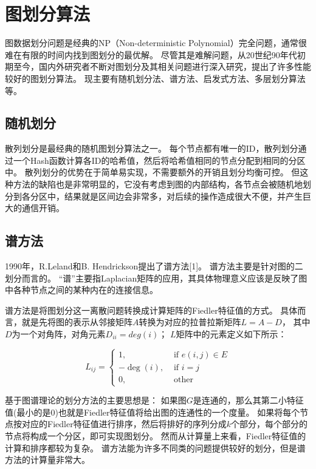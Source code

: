 \section{图划分算法}

图数据划分问题是经典的NP（Non-deterministic Polynomial）完全问题，通常很难在有限的时间内找到图划分的最优解。
尽管其是难解问题，从20世纪90年代初期至今，国内外研究者不断对图划分及其相关问题进行深入研究，提出了许多性能较好的图划分算法。
现主要有随机划分法、谱方法、启发式方法、多层划分算法等。

\subsection{随机划分}

散列划分是最经典的随机图划分算法之一。
每个节点都有唯一的ID，散列划分通过一个Hash函数计算各ID的哈希值，然后将哈希值相同的节点分配到相同的分区中。
散列划分的优势在于简单易实现，不需要额外的开销且划分均衡可控。
但这种方法的缺陷也是非常明显的，它没有考虑到图的内部结构，各节点会被随机地划分到各分区中，结果就是区间边会非常多，对后续的操作造成很大不便，并产生巨大的通信开销。

\subsection{谱方法}

1990年，R.Leland和B. Hendrickson提出了谱方法[1]。
谱方法主要是针对图的二划分而言的。
“谱”主要指Laplacian矩阵的应用，其具体物理意义应该是反映了图中各种节点之间的某种内在的连接信息。

谱方法是将图划分这一离散问题转换成计算矩阵的Fiedler特征值的方式。
具体而言，就是先将图的表示从邻接矩阵$A$转换为对应的拉普拉斯矩阵$L=A-D$，
其中$D$为一个对角阵，对角元素$D_{ii}=deg⁡(i)$；
$L$矩阵中的元素定义如下所示：

\begin{equation}
    L_{i j}=\left\{\begin{array}{cc}{1,} & {\text { if } e(i, j) \in E} \\ {-\operatorname{deg}(i),} & {\text { if } i=j} \\ {0,} & {\text { other }}\end{array}\right.
\end{equation}

基于图谱理论的划分方法的主要思想是：
如果图$G$是连通的，那么其第二小特征值(最小的是$0$)也就是Fiedler特征值将给出图的连通性的一个度量。
如果将每个节点按对应的Fiedler特征值进行排序，然后将排好的序列分成$k$个部分，每个部分的节点将构成一个分区，即可实现图划分。
然而从计算量上来看，Fiedler特征值的计算和排序都较为复杂。
谱方法能为许多不同类的问题提供较好的划分，但是谱方法的计算量非常大。

